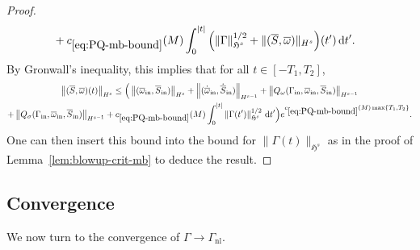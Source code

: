 \documentclass[AHL,Unicode,longabstracts,published]{cedram}
\newcommand{\rmin}{\mathrm{in}}
\newcommand{\nl}{\mathrm{nl}}
\renewcommand\bar{\overline}
\newcommand{\gH}{\mathfrak{H}}
\renewcommand\d[1]{{\ensuremath{\,\text{d}#1}}}
\begin{document}
\begin{proof}
\begin{multline}
\begin{aligned}
&+c_{\eqref{eq:PQ-mb-bound}}(M)\int_0^{|t|}\Big(
\|\Gamma\|_{\gH^s }^{1/2} +\|(\overline{S},\overline{\omega})\|_{H^s }\Big)(t')\d t'.
\end{aligned}
\end{multline}
By Gronwall's inequality, this implies that for all $t\in[-T_1,T_2]$,
\begin{multline*}
\left\|(\bar{S},\bar{\omega})(t)\right\|_{H^s}\leq \Big(\left\|(\overline{\omega}_\rmin, \overline{S}_\rmin)\right\|_{H^s} + \left\|(\dot{\overline{\omega}}_\rmin, \dot{\overline{S}}_\rmin)\right\|_{H^{s-1}} +\left\|Q_\omega(\Gamma_\rmin, \overline{\omega}_\rmin, \overline{S}_\rmin)\right\|_{H^{s-1}} \\
+\left\|Q_\sigma(\Gamma_\rmin, \overline{\omega}_\rmin, \overline{S}_\rmin)\right\|_{H^{s-1}}+c_{\eqref{eq:PQ-mb-bound}}(M)\int_0^{|t|}
\|\Gamma(t')\|_{\gH^s }^{1/2}\,\d t'\Big)e^{c_{\eqref{eq:PQ-mb-bound}}(M)\max\{T_1,T_2\}}.
\end{multline*}
One can then insert this bound into the bound for $\|\Gamma(t)\|_{\gH^s}$ as in the proof of Lemma~\ref{lem:blowup-crit-mb} to deduce the result.
\end{proof}



\subsection{Convergence}

We now turn to the convergence of $\Gamma \to \Gamma_\nl$.
\end{document}
